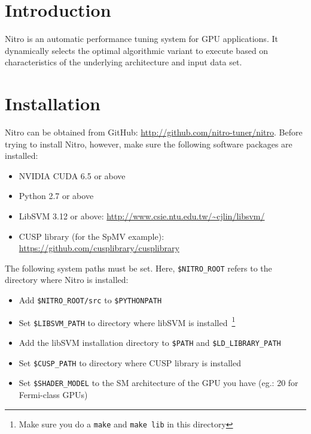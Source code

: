 \documentclass[12pt]{article}
\begin{document}
\maketitle

\section{Introduction}
Nitro is an automatic performance tuning system for GPU applications.
It dynamically selects the optimal algorithmic variant to execute based
on characteristics of the underlying architecture and input data set.  

\section{Installation}
Nitro can be obtained from GitHub: \url{http://github.com/nitro-tuner/nitro}.
Before trying to install Nitro, however, make sure the following software packages are installed:

\begin{itemize}
  \item NVIDIA CUDA 6.5 or above
  \item Python 2.7 or above
  \item LibSVM 3.12 or above: \url{http://www.csie.ntu.edu.tw/~cjlin/libsvm/}
  \item CUSP library (for the SpMV example): \url{https://github.com/cusplibrary/cusplibrary}
\end{itemize}

The following system paths must be set. Here, \texttt{\$NITRO\_ROOT} refers
to the directory where Nitro is installed:

\begin{itemize}
  \item Add \texttt{\$NITRO\_ROOT/src} to \texttt{\$PYTHONPATH}
  \item Set \texttt{\$LIBSVM\_PATH} to directory where libSVM is installed~\footnote{Make sure you do a \texttt{make} and \texttt{make lib} in this directory}
  \item Add the libSVM installation directory to \texttt{\$PATH} and \texttt{\$LD\_LIBRARY\_PATH}
  \item Set \texttt{\$CUSP\_PATH} to directory where CUSP library is installed
  \item Set \texttt{\$SHADER\_MODEL} to the SM architecture of the GPU you have (eg.: 20 for Fermi-class GPUs)
\end{itemize}
\end{document}

